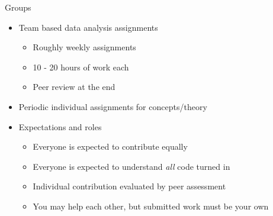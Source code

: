 \documentclass[ignorenonframetext,]{beamer}
\providecommand{\tightlist}{%
  \setlength{\itemsep}{0pt}\setlength{\parskip}{0pt}}
\begin{document}
\begin{frame}{Groups}
\protect\hypertarget{groups}{}

\begin{itemize}[<+->]
\item
  Team based data analysis assignments

  \begin{itemize}[<+->]
  \tightlist
  \item
    Roughly weekly assignments
  \item
    10 - 20 hours of work each
  \item
    Peer review at the end
  \end{itemize}
\item
  Periodic individual assignments for concepts/theory
\item
  Expectations and roles

  \begin{itemize}[<+->]
  \tightlist
  \item
    Everyone is expected to contribute equally
  \item
    Everyone is expected to understand \emph{all} code turned in
  \item
    Individual contribution evaluated by peer assessment
  \item
    You may help each other, but submitted work must be your own
  \end{itemize}
\end{itemize}

\end{frame}
\end{document}
